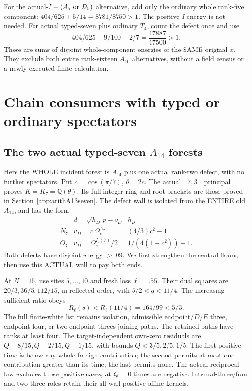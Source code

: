 \documentclass[11pt]{article}
\begin{document}
For the actual-\(I+(A_5\hbox{ or }D_5)\)
alternative, add only the ordinary whole
rank-five component:
\(404/625+5/14=8781/8750>1\).
The positive \(I\) energy is not needed.
For actual typed-seven plus ordinary \(T_4\),
count the defect once and use
\[
                  404/625+9/100+2/7
                         ={\frac{17887}{17500}}>1 .
\]
These are sums of disjoint whole-component
energies of the SAME original \(x\).
They exclude both entire rank-sixteen
\(A_{10}\) alternatives, without a field
census or a newly executed finite calculation.

\section{Chain consumers with typed or ordinary spectators}
\label{app:arithchainconsumers}
\subsection[The two actual typed-seven A14 forests]{The two actual typed-seven \(A_{14}\) forests}
\label{app:arithA14typed}

Here the WHOLE incident forest is \(A_{14}\)
plus one actual rank-two defect, with no
further spectators.
Put \(c=\cos(\pi/7)\), \(\theta=2c\).
The actual \([7,3]\) principal proves
\(K=K_7=\mathbb Q(\theta)\).
Its full integer ring and root brackets
are those proved in
Section~\ref{app:arithA13seven}.
The defect wall is isolated from the ENTIRE
old \(A_{14}\), and has the form
\[
 \begin{array}{c|c|c}
 &d=\sqrt{h_D}\,p-v_D&h_D\\ \hline
 N_7&v_D=c\,\Omega_e^{A_2}&(4/3)c^2-1\\
 O_7&v_D=\Omega_e^{I_2(7)}/2&
                       1/(4(1-c^2))-1 .
 \end{array}
\]
Both defects have disjoint energy \(>.09\).
We first strengthen the central floors,
then use this ACTUAL wall to pay both ends.

At \(N=15\), use sites \(5,\ldots,10\)
and fresh loss \(\ell=.55\).
Their dual squares are \(20/3,36/5,112/15\),
in reflected order, with \(5/2<q<11/4\).
The increasing sufficient ratio obeys
\[
                R_\ell(q)<R_\ell(11/4)=164/99<5/3 .
\]
The full finite-white list remains isolation,
admissible endpoint/\(D/E\) three, endpoint
four, or two endpoint threes joining paths.
The retained paths have ranks at least four.
The target-independent own-zero residuals
are \(Q-8/15,Q-2/15,Q-1/15\), with bounds
\(Q<3/5,2/5,1/5\).
The first positive time is below any whole
foreign contribution; the second permits
at most one contribution greater than its
time; the last permits none.
The actual reciprocal law excludes those
positive cases; at \(Q=0\) times are negative.
Internal-three/four and two-three roles
retain their all-wall positive affine kernels.
\end{document}
